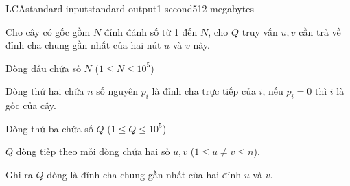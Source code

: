 \begin{problem}{LCA}{standard input}{standard output}{1 second}{512 megabytes}

Cho cây có gốc gồm $N$ đỉnh đánh số từ 1 đến $N$, cho $Q$ truy vấn $u, v$ cần trả về đỉnh cha chung gần nhất của hai nút $u$ và $v$ này.

\InputFile
Dòng đầu chứa số $N$ ($1\le N \le 10^5$)

Dòng thứ hai chứa $n$ số nguyên $p_i$ là đỉnh cha trực tiếp của $i$, nếu $p_i = 0$ thì $i$ là gốc của cây.

Dòng thứ ba chứa số $Q$ ($1\le Q\le 10^5$)

$Q$ dòng tiếp theo mỗi dòng chứa hai số $u, v$ ($1\le u\neq v\le n$).

\OutputFile
Ghi ra $Q$ dòng là đỉnh cha chung gần nhất của hai đỉnh $u$ và $v$.

\Example

\begin{example}
%
\end{example}

\end{problem}


